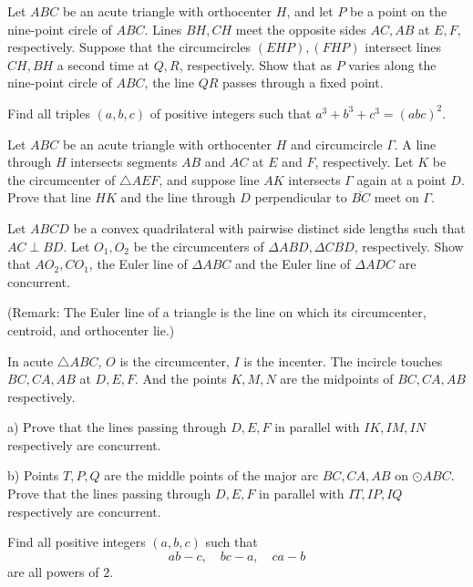 \documentclass[11pt]{scrartcl}
\begin{document}
\begin{problem}[8255863576892581507]
	Let $ABC$ be an acute triangle with orthocenter $H$, and let $P$ be a point on the nine-point circle of $ABC$. Lines $BH, CH$ meet the opposite sides $AC, AB$ at $E, F$, respectively. Suppose that the circumcircles $(EHP), (FHP)$ intersect lines $CH, BH$ a second time at $Q,R$, respectively. Show that as $P$ varies along the nine-point circle of $ABC$, the line $QR$ passes through a fixed point.
\end{problem}
\begin{problem}[7088779505939683183]
Find all triples $(a, b, c)$ of positive integers such that $a^3 + b^3 + c^3 = (abc)^2$.
\end{problem}
\begin{problem}[896600029778859256]
	Let $ABC$ be an acute triangle with orthocenter $H$ and circumcircle $\Gamma$. A line through $H$ intersects segments $AB$ and $AC$ at $E$ and $F$, respectively. Let $K$ be the circumcenter of $\triangle AEF$, and suppose line $AK$ intersects $\Gamma$ again at a point $D$. Prove that line $HK$ and the line through $D$ perpendicular to $\overline{BC}$ meet on $\Gamma$.
\end{problem}
\begin{problem}[8963205841174892420]
	Let $ABCD$ be a convex quadrilateral with pairwise distinct side lengths such that $AC\perp BD$. Let $O_1,O_2$ be the circumcenters of $\Delta ABD, \Delta CBD$, respectively. Show that $AO_2, CO_1$, the Euler line of $\Delta ABC$ and the Euler line of $\Delta ADC$ are concurrent.

(Remark: The Euler line of a triangle is the line on which its circumcenter, centroid, and orthocenter lie.)
\end{problem}
\begin{problem}[423911944927735]
In acute $\triangle ABC$, $O$ is the circumcenter, $I$ is the incenter. The incircle touches $BC,CA,AB$ at $D,E,F$. And the points $K,M,N$ are the midpoints of $BC,CA,AB$ respectively.

a) Prove that the lines passing through $D,E,F$ in parallel with $IK,IM,IN$ respectively are concurrent.

b) Points $T,P,Q$ are the middle points of the major arc $BC,CA,AB$ on $\odot ABC$. Prove that the lines passing through $D,E,F$ in parallel with $IT,IP,IQ$ respectively are concurrent.
\end{problem}
\begin{problem}[5113543632741494138]
Find all positive integers $(a,b,c)$ such that
$$ab-c,\quad bc-a,\quad ca-b$$are all powers of $2$.
\end{problem}
\end{document}

